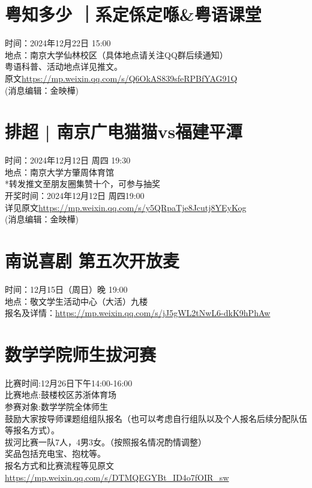 \documentclass[letterpaper, 12pt]{article}
\begin{document}
\begin{multicols}{2}
\section{粤知多少 ｜系定係定喺\&粤语课堂}
时间：2024年12月22日 15:00\\
地点：南京大学仙林校区（具体地点请关注QQ群后续通知）\\
粤语科普、活动地点详见推文。\\
原文\url{https://mp.weixin.qq.com/s/Q6OkAS839sfeRPBfYAG91Q}\\
(消息编辑：金映樺)

\section{排超 | 南京广电猫猫vs福建平潭}
时间：2024年12月12日 周四 19:30\\
地点：南京大学方肇周体育馆\\
*转发推文至朋友圈集赞十个，可参与抽奖\\
开奖时间：2024年12月12日 周四19:00\\
详见原文\url{https://mp.weixin.qq.com/s/y5QRpaTje8Jcutj8YEyKog}\\
(消息编辑：金映樺)

\section{南说喜剧 第五次开放麦}
时间：12月15日（周日）晚 19:00\\
地点：敬文学生活动中心（大活）九楼\\
报名及详情：\url{https://mp.weixin.qq.com/s/jJ5gWL2tNwL6-dkK9hPhAw}\\

\section{数学学院师生拔河赛}
比赛时间:12月26日下午14:00-16:00\\
比赛地点:鼓楼校区苏浙体育场\\
参赛对象:数学学院全体师生\\
鼓励大家按导师课题组组队报名（也可以考虑自行组队以及个人报名后续分配队伍等报名方式）。\\
拔河比赛一队7人，4男3女。（按照报名情况酌情调整）\\
奖品包括充电宝、抱枕等。\\
报名方式和比赛流程等见原文\url{https://mp.weixin.qq.com/s/DTMQEGYBt_ID4o7fOIR_sw}\\



\end{multicols}
\end{document}
